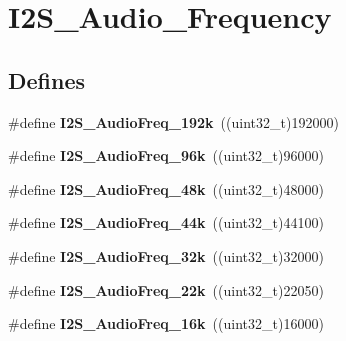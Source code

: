 \hypertarget{group__I2S__Audio__Frequency}{
\section{I2S\_\-Audio\_\-Frequency}
\label{group__I2S__Audio__Frequency}
}
\subsection*{Defines}
\begin{DoxyCompactItemize}
\item 
\hypertarget{group__I2S__Audio__Frequency_gadfdaed9a2acb71f2cdd737be81a6f747}{
\#define {\bfseries I2S\_\-AudioFreq\_\-192k}~((uint32\_\-t)192000)}
\label{group__I2S__Audio__Frequency_gadfdaed9a2acb71f2cdd737be81a6f747}

\item 
\hypertarget{group__I2S__Audio__Frequency_ga5acd02a974e90bb8f2c4e07f8fa0231b}{
\#define {\bfseries I2S\_\-AudioFreq\_\-96k}~((uint32\_\-t)96000)}
\label{group__I2S__Audio__Frequency_ga5acd02a974e90bb8f2c4e07f8fa0231b}

\item 
\hypertarget{group__I2S__Audio__Frequency_gac5f3f0416f9dd03d680d0fcee93b50ab}{
\#define {\bfseries I2S\_\-AudioFreq\_\-48k}~((uint32\_\-t)48000)}
\label{group__I2S__Audio__Frequency_gac5f3f0416f9dd03d680d0fcee93b50ab}

\item 
\hypertarget{group__I2S__Audio__Frequency_ga3514e4c292b92b8a7d8a6916f4e3690c}{
\#define {\bfseries I2S\_\-AudioFreq\_\-44k}~((uint32\_\-t)44100)}
\label{group__I2S__Audio__Frequency_ga3514e4c292b92b8a7d8a6916f4e3690c}

\item 
\hypertarget{group__I2S__Audio__Frequency_gac501b566718f4890aaafa323a33b732c}{
\#define {\bfseries I2S\_\-AudioFreq\_\-32k}~((uint32\_\-t)32000)}
\label{group__I2S__Audio__Frequency_gac501b566718f4890aaafa323a33b732c}

\item 
\hypertarget{group__I2S__Audio__Frequency_gac6adafe5586e83c2408f1eab8edb4ab3}{
\#define {\bfseries I2S\_\-AudioFreq\_\-22k}~((uint32\_\-t)22050)}
\label{group__I2S__Audio__Frequency_gac6adafe5586e83c2408f1eab8edb4ab3}

\item 
\hypertarget{group__I2S__Audio__Frequency_ga5b8f2f8393e022becf0dbb04d1b01950}{
\#define {\bfseries I2S\_\-AudioFreq\_\-16k}~((uint32\_\-t)16000)}
\label{group__I2S__Audio__Frequency_ga5b8f2f8393e022becf0dbb04d1b01950}


\end{DoxyCompactItemize}

